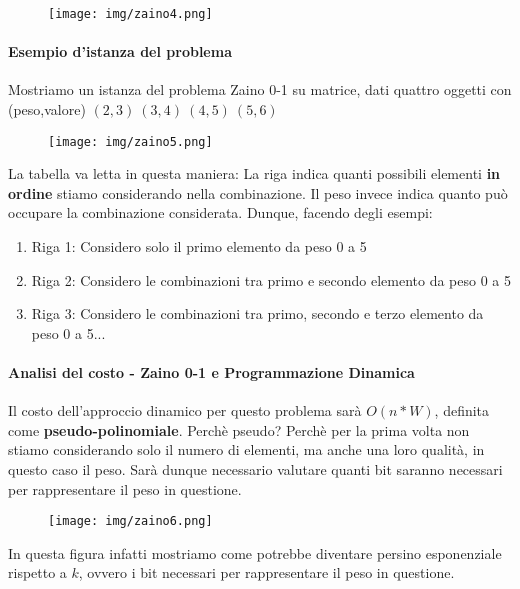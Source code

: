 \documentclass{article}
\begin{document}
\begin{figure}[htbp]
        \center
        \texttt{[image: img/zaino4.png]}
\end{figure}

\paragraph{Esempio d'istanza del problema} Mostriamo un istanza del problema Zaino 0-1 su matrice, dati quattro oggetti con (peso,valore)
$(2,3) \: (3,4) \: (4,5) \: (5,6)$

\begin{figure}[htbp]
        \center
        \texttt{[image: img/zaino5.png]}
\end{figure}

La tabella va letta in questa maniera: La riga indica quanti possibili elementi \textbf{in ordine} stiamo considerando nella combinazione. Il peso invece indica quanto può occupare la combinazione considerata. Dunque, facendo degli esempi:

\begin{enumerate}
    \item Riga 1: Considero solo il primo elemento da peso 0 a 5
    \item Riga 2: Considero le combinazioni tra primo e secondo elemento da peso 0 a 5
    \item Riga 3: Considero le combinazioni tra primo, secondo e terzo elemento da peso 0 a 5...
\end{enumerate}

\newpage

\paragraph{Analisi del costo - Zaino 0-1 e Programmazione Dinamica} Il costo dell'approccio dinamico per questo problema sarà $O(n*W)$, definita come \textbf{pseudo-polinomiale}. Perchè pseudo? Perchè per la prima volta non stiamo considerando solo il numero di elementi, ma anche una loro qualità, in questo caso il peso. Sarà dunque necessario valutare quanti bit saranno necessari per rappresentare il peso in questione.

\begin{figure}[htbp]
        \center
        \texttt{[image: img/zaino6.png]}
\end{figure}

In questa figura infatti mostriamo come potrebbe diventare persino esponenziale rispetto a $k$, ovvero i bit necessari per rappresentare il peso in questione.
\end{document}
